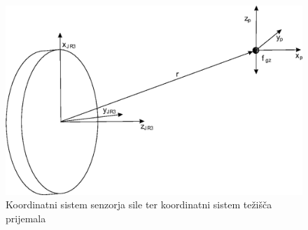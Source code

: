 \begin{figure}
	\centering
	\includegraphics[scale=0.5]{./Slike/jr3_coordinatesistem.eps}
	\caption{Koordinatni sistem senzorja sile ter koordinatni sistem te\v{z}i\v{s}\v{c}a prijemala}
	\label{fig:jr3_coordinatesistem}
\end{figure}
